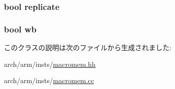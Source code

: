 \label{classArmISA_1_1VstSingleOp64_afb0be420b537599a5b86558127502040}
\hypertarget{classArmISA_1_1VstSingleOp64_a8f2b56ecc4db4f48e2c08aef78591efc}{
\subsubsection[{replicate}]{\setlength{\rightskip}{0pt plus 5cm}bool {\bf replicate}}}
\label{classArmISA_1_1VstSingleOp64_a8f2b56ecc4db4f48e2c08aef78591efc}
\hypertarget{classArmISA_1_1VstSingleOp64_a93541ed16711b2c9c53cf093b675d90b}{
\subsubsection[{wb}]{\setlength{\rightskip}{0pt plus 5cm}bool {\bf wb}}}
\label{classArmISA_1_1VstSingleOp64_a93541ed16711b2c9c53cf093b675d90b}


このクラスの説明は次のファイルから生成されました:\begin{DoxyCompactItemize}
\item 
arch/arm/insts/\hyperlink{macromem_8hh}{macromem.hh}\item 
arch/arm/insts/\hyperlink{macromem_8cc}{macromem.cc}\end{DoxyCompactItemize}
